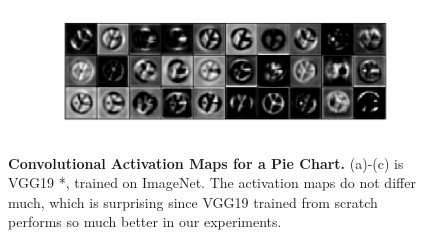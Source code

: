 \documentclass[journal]{vgtc}        %
\begin{document}
\begin{figure}[tbhp]
{	  \includegraphics[width=.48\linewidth]{../gfx/ACTIVATIONMAPS/vgg_from_scratch_block3_conv3.pdf}
	}
	\hfill
	\hfill
  \caption{\textbf{Convolutional Activation Maps for a Pie Chart.} (a)-(c) is VGG19 *, trained on ImageNet. The activation maps do not differ much, which is surprising since VGG19 trained from scratch performs so much better in our experiments.}
	\label{fig:activationmaps}
\end{figure}
\end{document}
